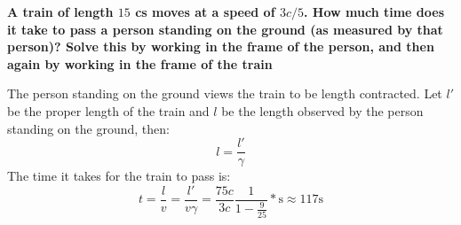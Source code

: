 \documentclass[9pt]{report}
\begin{document}
\begin{enumerate}
  \textbf{A train of length $15$ cs moves at a speed of $3c/5$. How much time
  does it take to pass a person standing on the ground (as measured by that
  person)? Solve this by working in the frame of the person, and then again
  by working in the frame of the train}

  The person standing on the ground views the train to be length contracted.
  Let $l'$ be the proper length of the train and $l$ be the length observed
  by the person standing on the ground, then:
  \[
    l = \frac{l'}{\gamma}
  \]
  The time it takes for the train to pass is:
  \[
    t = \frac{l}{v} = \frac{l'}{v\gamma} = \frac{75 c}{3c}\frac{1}{1 - \frac{9}{25}}* \text{s} \approx 117 \text{s}
  \]
\end{enumerate}
\end{document}
